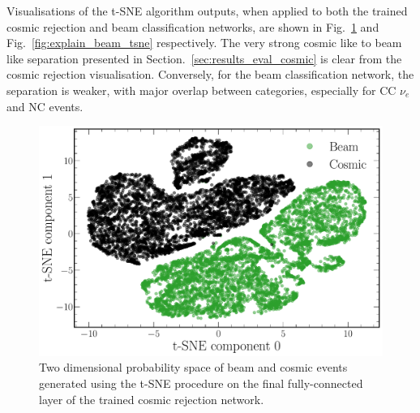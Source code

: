 Visualisations of the t-SNE algorithm outputs, when applied to both the trained cosmic rejection
and beam classification networks, are shown in Fig.~\ref{fig:explain_cosmic_tsne} and
Fig.~\ref{fig:explain_beam_tsne} respectively. The very strong cosmic like to beam like separation
presented in Section.~\ref{sec:results_eval_cosmic} is clear from the cosmic rejection
visualisation. Conversely, for the beam classification network, the separation is weaker, with
major overlap between categories, especially for CC $\nu_{e}$ and NC events.

\begin{figure} %
    \includegraphics[width=\textwidth]{diagrams/7-results/explain_cosmic_tsne.pdf}
    \caption[Cosmic rejection network output t-SNE space]
    {Two dimensional probability space of beam and cosmic events generated using the t-SNE
        procedure on the final fully-connected layer of the trained cosmic rejection network.}
    \label{fig:explain_cosmic_tsne}
\end{figure}


